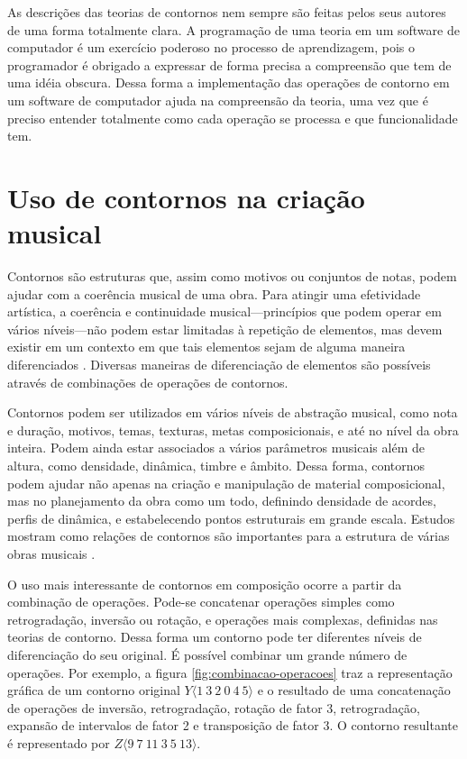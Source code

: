 As descrições das teorias de contornos nem sempre são feitas pelos
seus autores de uma forma totalmente clara. A programação de uma
teoria em um software de computador é um exercício poderoso no
processo de aprendizagem, pois o programador é obrigado a expressar de
forma precisa a compreensão que tem de uma idéia obscura. Dessa forma
a implementação das operações de contorno em um software de computador
ajuda na compreensão da teoria, uma vez que é preciso entender
totalmente como cada operação se processa e que funcionalidade tem.

\section{Uso de contornos na criação musical}
\label{sec:uso-de-contornos}

Contornos são estruturas que, assim como motivos ou conjuntos de
notas, podem ajudar com a coerência musical de uma obra. Para atingir
uma efetividade artística, a coerência e continuidade
musical---princípios que podem operar em vários níveis---não podem
estar limitadas à repetição de elementos, mas devem existir em um
contexto em que tais elementos sejam de alguma maneira diferenciados
\cite[p. 296]{kliewer75:aspects}. Diversas maneiras de diferenciação
de elementos são possíveis através de combinações de operações de
contornos.

Contornos podem ser utilizados em vários níveis de abstração musical,
como nota e duração, motivos, temas, texturas, metas composicionais, e
até no nível da obra inteira. Podem ainda estar associados a vários
parâmetros musicais além de altura, como densidade, dinâmica, timbre e
âmbito. Dessa forma, contornos podem ajudar não apenas na criação e
manipulação de material composicional, mas no planejamento da obra
como um todo, definindo densidade de acordes, perfis de dinâmica, e
estabelecendo pontos estruturais em grande escala. Estudos mostram
como relações de contornos são importantes para a estrutura de várias
obras musicais
\cite{friedmann85:methodology,clifford95:contour,beard03:contour}.

O uso mais interessante de contornos em composição ocorre a partir da
combinação de operações. Pode-se concatenar operações simples como
retrogradação, inversão ou rotação, e operações mais complexas,
definidas nas teorias de contorno. Dessa forma um contorno pode ter
diferentes níveis de diferenciação do seu original. É possível
combinar um grande número de operações. Por exemplo, a figura
\ref{fig:combinacao-operacoes} traz a representação gráfica de um
contorno original $Y\langle1\:3\:2\:0\:4\:5\rangle$ e o resultado de
uma concatenação de operações de inversão, retrogradação, rotação de
fator 3, retrogradação, expansão de intervalos de fator 2 e
transposição de fator 3. O contorno resultante é representado por
$Z\langle9\:7\:11\:3\:5\:13\rangle$.

